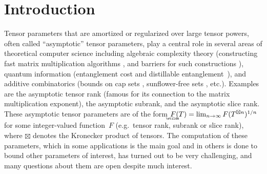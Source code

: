 \documentclass{daj}
\begin{document}
\begin{frontmatter}[classification=text]
\begin{abstract}
    We prove a general discreteness theorem for asymptotic tensor parameters of order-three tensors and use this to prove that (1) over any finite field (and in fact any finite set of coefficients in any field), the asymptotic subrank and the asymptotic slice rank have no accumulation points, and (2) over the complex numbers, the asymptotic slice rank has no accumulation points.

    Central to our approach are two new general lower bounds on the asymptotic subrank of tensors, which measures how much a tensor can be diagonalized. The first lower bound says that the asymptotic subrank of any concise three-tensor is at least the cube root of the smallest dimension. The second lower bound says that any concise three-tensor that is ``narrow enough'' (has one dimension much smaller than the other two) has maximal asymptotic subrank.
%
\end{abstract}
\end{frontmatter}

\tableofcontents

\newpage
\section{Introduction}

Tensor parameters that are amortized or regularized over large tensor powers, often called ``asymptotic'' tensor parameters, play a central role in several areas of theoretical computer science including 
algebraic complexity theory (constructing fast matrix multiplication algorithms \cite{burgisser1997algebraic, blaser2013fast}, and barriers for such constructions \cite{alman2018limits,v017a002}), 
quantum information (entanglement cost and distillable entanglement~\cite{watrous_2018,brandao2016mathematics,vrana2015transformation}), 
and additive combinatorics (bounds on cap sets \cite{tao}, sunflower-free sets \cite{naslund_sawin_2017}, etc.). %
%
Examples are the asymptotic tensor rank (famous for its connection to the matrix multiplication exponent), the asymptotic subrank, and the asymptotic slice rank. %
These asymptotic tensor parameters are of the form $\underaccent{\wtilde}{F}(T) = \lim_{n\to \infty} F(T^{\boxtimes n})^{1/n}$ for some integer-valued function~$F$ (e.g.~tensor rank, subrank or slice rank), where $\boxtimes$ denotes the Kronecker product of tensors. 
The computation of these parameters, which in some applications is the main goal and in others is done to bound other parameters of interest, has turned out to be very challenging, and many questions about them are open despite much interest.
\end{document}

